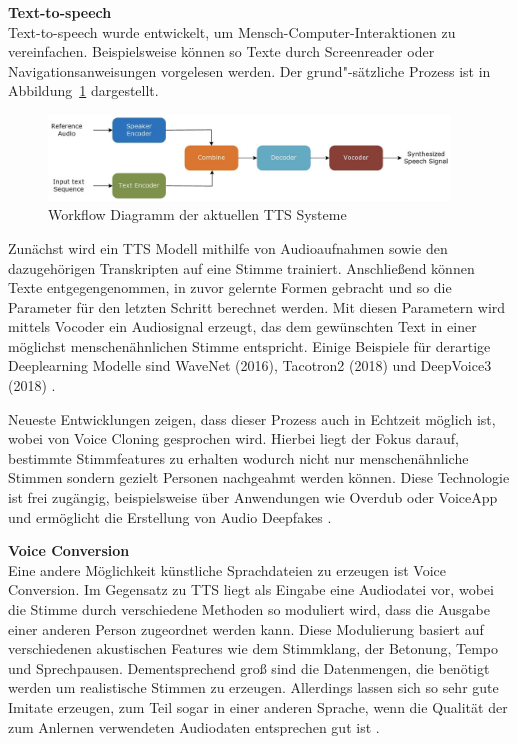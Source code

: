 \textbf{Text-to-speech}\\
Text-to-speech wurde entwickelt, um Mensch-Computer-Interaktionen zu vereinfachen.
Beispielsweise können so Texte durch Screenreader oder Navigationsanweisungen vorgelesen werden.
Der grund"-sätzliche Prozess ist in Abbildung~\ref{fig:tts} \citep[][]{Masood2022} dargestellt.

\begin{figure}[htp]
\begin{center}
  \includegraphics[width=0.95\textwidth]{assets/TTS.png}
  \caption[labelInTOC]{Workflow Diagramm der aktuellen TTS Systeme \citep[][]{Masood2022}}
  \label{fig:tts}
\end{center}
\end{figure}

Zunächst wird ein TTS Modell mithilfe von Audioaufnahmen sowie den dazugehörigen Transkripten auf eine Stimme trainiert.
Anschließend können Texte entgegengenommen, in zuvor gelernte Formen gebracht und so die Parameter für den letzten Schritt berechnet werden.
Mit diesen Parametern wird mittels Vocoder ein Audiosignal erzeugt, das dem gewünschten Text in einer möglichst menschenähnlichen Stimme entspricht.
Einige Beispiele für derartige Deeplearning Modelle sind WaveNet (2016), Tacotron2 (2018) und DeepVoice3 (2018) \citep[vgl.][]{Almutairi2022}.

Neueste Entwicklungen zeigen, dass dieser Prozess auch in Echtzeit möglich ist, wobei von Voice Cloning gesprochen wird.
Hierbei liegt der Fokus darauf, bestimmte Stimmfeatures zu erhalten wodurch nicht nur menschenähnliche Stimmen sondern gezielt Personen nachgeahmt werden können.
Diese Technologie ist frei zugängig, beispielsweise über Anwendungen wie Overdub oder VoiceApp und ermöglicht die Erstellung von Audio Deepfakes \citep[][]{Masood2022}.

\textbf{Voice Conversion}\\
Eine andere Möglichkeit künstliche Sprachdateien zu erzeugen ist Voice Conversion.
Im Gegensatz zu TTS liegt als Eingabe eine Audiodatei vor, wobei die Stimme durch verschiedene Methoden so moduliert wird, dass die Ausgabe einer anderen Person zugeordnet werden kann.
Diese Modulierung basiert auf verschiedenen akustischen Features wie dem Stimmklang, der Betonung, Tempo und Sprechpausen.
Dementsprechend groß sind die Datenmengen, die benötigt werden um realistische Stimmen zu erzeugen.
Allerdings lassen sich so sehr gute Imitate erzeugen, zum Teil sogar in einer anderen Sprache, wenn die Qualität der zum Anlernen verwendeten Audiodaten entsprechen gut ist \citep[][]{Masood2022}.

